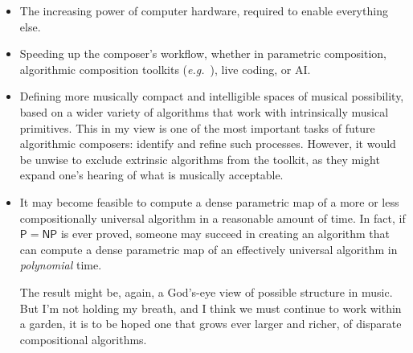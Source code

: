 \documentclass[]{interact}
\theoremstyle{plain}%
\theoremstyle{definition}
\theoremstyle{remark}
\begin{document}
\begin{itemize}
\item The increasing power of computer hardware, required to enable everything else.
\item Speeding up the composer's workflow, whether in parametric composition, algorithmic composition toolkits (\emph{e.g.}\ \citet{bellingham2019toward}), live coding, or AI.
\item Defining more musically compact and intelligible spaces of musical possibility, based on a wider variety of algorithms that work with intrinsically musical primitives. This in my view is one of the most important tasks of future algorithmic composers: identify and refine such processes. However, it would be unwise to exclude extrinsic algorithms from the toolkit, as they might expand one's hearing of what is musically acceptable.
\item  It may become feasible to compute a dense parametric map of a more or less compositionally universal algorithm in a reasonable amount of time. In fact, if $\mathsf{P} = \mathsf{NP}$ is ever proved, someone may succeed in creating an algorithm that can compute a dense parametric map of an effectively universal algorithm in \emph{polynomial} time. 

The result might be, again, a God's-eye view of possible structure in music. But I'm not holding my breath, and I think we must continue to work within a garden, it is to be hoped one that grows ever larger and richer, of disparate compositional algorithms.
\end{itemize}




\end{document}
